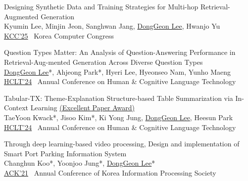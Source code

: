 \documentclass[11pt,a4paper]{article}
\newlength{\leftcolumn}
\newlength{\midcolumn}
\newlength{\rightcolumn}
\newcounter{pubnum}
\newenvironment{publications}
{\begin{list}{}
    {\setlength{\leftmargin}{1.35in}
     \setlength{\itemsep}{0.5em}
     \setlength{\labelsep}{0em}
     \renewcommand{\makelabel}[1]{##1}}}
{\end{list}}
\newcommand{\pubitem}[1]{%
    \addtocounter{pubnum}{-1}%
    \item[\textup{[\arabic{pubnum}]}] #1%
}
\begin{document}
\begin{publications}
\pubitem{
    Designing Synthetic Data and Training Strategies for Multi-hop Retrieval-Augmented Generation\\
        Kyumin Lee, Minjin Jeon, Sanghwan Jang, \underline{DongGeon Lee}, Hwanjo Yu \\[3pt]
        \href{}{KCC'25} \textbar\ Korea Computer Congress
}

\pubitem{
    Question Types Matter: An Analysis of Question-Answering Performance in Retrieval-Aug-mented Generation Across Diverse Question Types\\
        \underline{DongGeon Lee}*, Ahjeong Park*, Hyeri Lee, Hyeonseo Nam, Yunho Maeng \\[3pt]
        \href{https://koreascience.kr/article/CFKO202404272002603.page}{HCLT'24} \textbar\ Annual Conference on Human \& Cognitive Language Technology 
}

\pubitem{
    Tabular-TX: Theme-Explanation Structure-based Table Summarization via In-Context Learning \href{https://kli.korean.go.kr/benchmark/taskBoardsOrdtm/boardsOrdtm/noticeView.do?page=0&recordId=269&boardOrdtmId=&base.condition=boardOrdtm.title&base.keyword=&size=10}{(Excellent Paper Award)}\\
        TaeYoon Kwack*, Jisoo Kim*, Ki Yong Jung, \underline{DongGeon Lee}, Heesun Park  \\[3pt]
        \href{https://koreascience.kr/article/CFKO202404272003862.page}{HCLT'24} \textbar\ Annual Conference on Human \& Cognitive Language Technology
}

\pubitem{
    Through deep learning-based video processing, Design and implementation of Smart Port Parking Information System\\
        Changhun Koo*, Yoonjoo Jung*, \underline{DongGeon Lee}*\\[3pt]
        \href{https://doi.org/10.3745/PKIPS.y2021m11a.1342}{ACK'21} \textbar\ Annual Conference of Korea Information Processing Society
}


\end{publications}

\vspace{1em}

\end{document}
